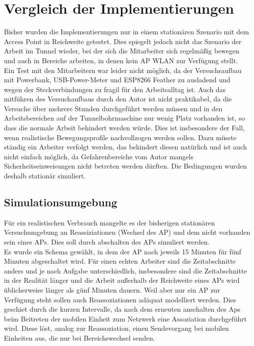 \chapter{Vergleich der Implementierungen}
\label{ch:vergleich}
Bisher wurden die Implementierungen nur in einem stationären Szenario mit dem Access Point in Reichweite getestet. 
Dies spiegelt jedoch nicht das Szenario der Arbeit im Tunnel wieder, bei der sich die Mitarbeiter sich regelmäßig bewegen und auch in Bereiche arbeiten, in denen kein AP WLAN zur Verfügung stellt. \\
Ein Test mit den Mitarbeitern war leider nicht möglich, da der Versuchsaufbau mit Powerbank, USB-Power-Meter und ESP8266 Feather zu ausladend und wegen der Steckverbindungen zu fragil für den Arbeitsalltag ist.
Auch das mitführen des Versuchaufbaus durch den Autor ist nicht praktikabel, da die Versuche über mehrere Stunden durchgeführt werden müssen und in den Arbeitsbereichen auf der Tunnelbohrmaschine nur wenig Platz vorhanden ist, so dass die normale Arbeit behindert werden würde.
Dies ist insbesondere der Fall, wenn realistische Bewegungsprofile nachvollzogen werden sollen. 
Dazu müsste ständig ein Arbeiter verfolgt werden, das behindert diesen natürlich und ist auch nicht einfach möglich, da Gefahrenbereiche vom Autor mangels Sicherheitseinweisungen nicht betreten werden dürften.
Die Bedingungen wurden deshalb stationär simuliert.

\section{Simulationsumgebung}
Für ein realistischen Verbrauch mangelte es der bisherigen stationären Versuchumgebung an Reassiziationen (Wechsel des AP) und dem nicht vorhanden sein eines APs.
Dies soll durch abschalten des APs simuliert werden. \\
Es wurde ein Schema gewählt, in dem der AP nach jeweils 15 Minuten für fünf Minuten abgeschaltet wird. 
Für einen echten Arbeiter sind die Zeitabschnitte anders und je nach Aufgabe unterschiedlich, insbesondere sind die Zeitabschnitte in der Realität länger und die Arbeit außerhalb der Reichweite eines APs wird üblicherweise länger als günf Minuten dauern.
Weil aber nur ein AP zur Verfügung steht sollen auch Reassoziationen adäquat modelliert werden.
Dies geschiet durch die kurzen Intervalle, da nach dem erneuten anschalten des Aps beim Beitreten der mobilen Einheit zum Netzwerk eine Assoziation durchgeführt wird. 
Diese löst, analog zur Reassoziation, einen Sendevorgang bei mobilen Einheiten aus, die nur bei Bereichswechsel senden.

